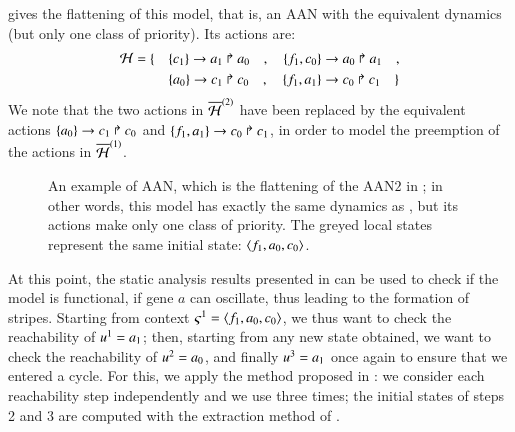  gives the flattening of this model,
that is, an AAN with the equivalent dynamics
(but only one class of priority).
Its actions are:
\begin{align*}
  \mathcal{H} = \{ \quad
    & \{c_1\}\rightarrow a_1\Rsh a_0 \quad , \quad
    \{f_1, c_0\}\rightarrow a_0\Rsh a_1 \quad , \\
    & \{a_0\}\rightarrow c_1\Rsh c_0 \quad , \quad
    \{f_1, a_1\}\rightarrow c_0\Rsh c_1
  \quad \}
\end{align*}
We note that the two actions in $\overline{\mathcal{H}}^{(2)}$ have been replaced by
the equivalent actions
$\{a_0\}\rightarrow c_1\Rsh c_0$ and $\{f_1, a_1\}\rightarrow c_0\Rsh c_1$,
in order to model the preemption of the actions in $\overline{\mathcal{H}}^{(1)}$.

\begin{figure}[p]
  \centering
  \caption{
  \label{fig:metazoan-ph}
    An example of AAN, which is the flattening of the AAN$2$ in ;
    in other words, this model has exactly the same dynamics as
    , but its actions make only one class of priority.
    The greyed local states represent the same initial state:
    $\mbox{$\langle f_1, a_0, c_0 \rangle$}$.
  }
\end{figure}

\medskip

At this point, the static analysis results presented in
 can be used to check if the model is functional,
\ie if gene $a$ can oscillate, thus leading to the formation of stripes.
Starting from context $\varsigma^1 = \mbox{$\langle f_1, a_0, c_0 \rangle$}$,
we thus want to check the reachability of $u^1 = a_1$;
then, starting from any new state obtained,
we want to check the reachability of $u^2 = a_0$,
and finally $u^3 = a_1$ once again to ensure that we entered a cycle.
For this, we apply the method proposed in :
we consider each reachability step independently
and we use  three times;
the initial states of steps 2 and 3 are computed with the
extraction method of .

